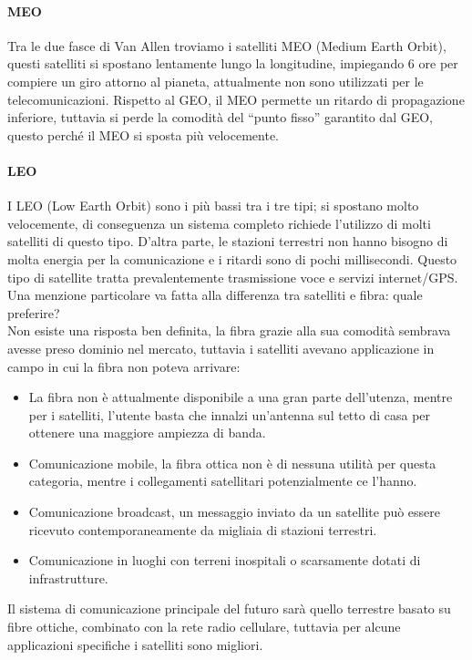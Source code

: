 \paragraph{MEO}
Tra le due fasce di Van Allen troviamo i satelliti MEO (Medium Earth Orbit), questi satelliti si spostano lentamente lungo la longitudine, impiegando 6 ore per compiere un giro attorno al pianeta, attualmente non sono utilizzati per le telecomunicazioni. Rispetto al GEO, il MEO permette un ritardo di propagazione inferiore, tuttavia si perde la comodità del “punto fisso” garantito dal GEO, questo perché il MEO si sposta più velocemente.
\paragraph{LEO}
I LEO (Low Earth Orbit) sono i più bassi tra i tre tipi; si spostano molto velocemente, di conseguenza un sistema completo richiede l’utilizzo di molti satelliti di questo tipo. D’altra parte, le stazioni terrestri non hanno bisogno di molta energia per la comunicazione e i ritardi sono di pochi millisecondi.
Questo tipo di satellite tratta prevalentemente trasmissione voce e servizi internet/GPS. \\

Una menzione particolare va fatta alla differenza tra satelliti e fibra: quale preferire? \\
Non esiste una risposta ben definita, la fibra grazie alla sua comodità sembrava avesse preso dominio nel mercato, tuttavia i satelliti avevano applicazione in campo in cui la fibra non poteva arrivare:
\begin{itemize}
\item	La fibra non è attualmente disponibile a una gran parte dell’utenza, mentre per i satelliti, l’utente basta che innalzi un’antenna sul tetto di casa per ottenere una maggiore ampiezza di banda.
\item	Comunicazione mobile, la fibra ottica non è di nessuna utilità per questa categoria, mentre i collegamenti satellitari potenzialmente ce l’hanno.
\item	Comunicazione broadcast, un messaggio inviato da un satellite può essere ricevuto contemporaneamente da migliaia di stazioni terrestri.
\item	Comunicazione in luoghi con terreni inospitali o scarsamente dotati di infrastrutture.
\end{itemize}
Il sistema di comunicazione principale del futuro sarà quello terrestre basato su fibre ottiche, combinato con la rete radio cellulare, tuttavia per alcune applicazioni specifiche i satelliti sono migliori.


